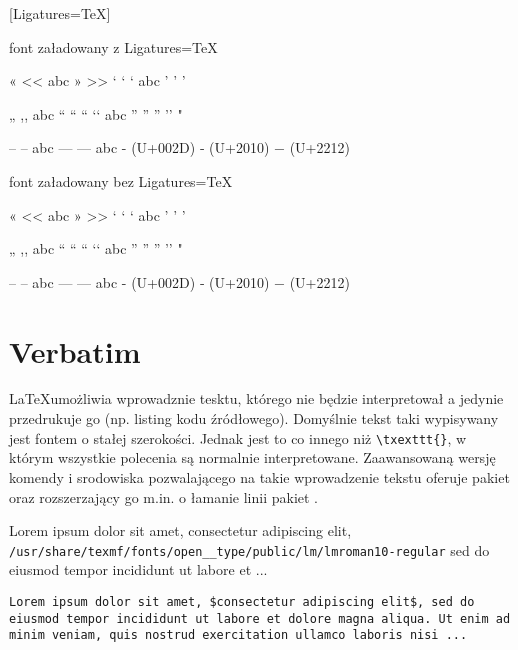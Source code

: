 \documentclass[fontSize=10pt,bmargin=2.2cm,extra]{pdfArticle}
\begin{document}
\newcommand{\printSpecials}{
	« \guillemotleft{}     {\addfontfeatures{Color=ff6600} <<         }
		abc
	» \guillemotright{}    {\addfontfeatures{Color=ff6600}  >>        }
		\hspace{0.66cm}
	‘ \textquoteleft{}     {\addfontfeatures{Color=ff6600} `          }
		abc
	’ \textquoteright{}    {\addfontfeatures{Color=ff6600} '          }
	
	„ \quotedblbase{}      {\addfontfeatures{Color=ff6600}  ,,        }
		abc
	“ \textquotedblleft{}  {\addfontfeatures{Color=ff6600}  ``  ‘‘    }
		abc
	” \textquotedblright{} {\addfontfeatures{Color=ff6600} ''  ’’  "  }
	
	–                      {\addfontfeatures{Color=ff6600} --         } %
		abc
	—                      {\addfontfeatures{Color=ff6600} ---        } %
		abc
	- {\tiny(U+002D)} ‐ {\tiny(U+2010)} − {\tiny(U+2212)}               %
}

\begin{minipage}[t]{0.47\textwidth}
	[Ligatures=TeX] \centerline{font załadowany z Ligatures=TeX}
	\printSpecials
\end{minipage}
\hfill
\begin{minipage}[t]{0.47\textwidth}
	 \centerline{font załadowany bez Ligatures=TeX}
	\printSpecials
\end{minipage}

\section*{Verbatim}

\LaTeX umożliwia wprowadznie tesktu, którego nie będzie interpretował a jedynie przedrukuje go (np. listing kodu źródłowego).
Domyślnie tekst taki wypisywany jest fontem o stałej szerokości. Jednak jest to co innego niż \Verb$\txexttt{}$, w którym wszystkie polecenia są normalnie interpretowane.
Zaawansowaną wersję komendy i srodowiska pozwalającego na takie wprowadzenie tekstu oferuje pakiet  oraz rozszerzający go m.in. o łamanie linii pakiet .

\begin{CatchExample}
{}
Lorem ipsum dolor sit amet, consectetur adipiscing elit, \Verb$/usr/share/texmf/fonts/open__type/public/lm/lmroman10-regular$ sed do eiusmod tempor incididunt ut labore et ...
\begin{Verbatim}
Lorem ipsum dolor sit amet, $consectetur adipiscing elit$, sed do eiusmod tempor incididunt ut labore et dolore magna aliqua. Ut enim ad minim veniam, quis nostrud exercitation ullamco laboris nisi ...
\end{Verbatim}
\end{CatchExample}
\end{document}
